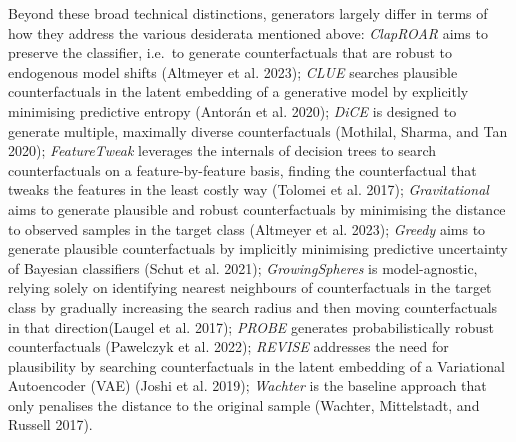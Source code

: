 \documentclass{juliacon}
\begin{document}
Beyond these broad technical distinctions, generators largely differ in
terms of how they address the various desiderata mentioned above:
\emph{ClapROAR} aims to preserve the classifier, i.e.~to generate
counterfactuals that are robust to endogenous model shifts (Altmeyer et
al. 2023); \emph{CLUE} searches plausible counterfactuals in the latent
embedding of a generative model by explicitly minimising predictive
entropy (Antorán et al. 2020); \emph{DiCE} is designed to generate
multiple, maximally diverse counterfactuals (Mothilal, Sharma, and Tan
2020); \emph{FeatureTweak} leverages the internals of decision trees to
search counterfactuals on a feature-by-feature basis, finding the
counterfactual that tweaks the features in the least costly way (Tolomei
et al. 2017); \emph{Gravitational} aims to generate plausible and robust
counterfactuals by minimising the distance to observed samples in the
target class (Altmeyer et al. 2023); \emph{Greedy} aims to generate
plausible counterfactuals by implicitly minimising predictive
uncertainty of Bayesian classifiers (Schut et al. 2021);
\emph{GrowingSpheres} is model-agnostic, relying solely on identifying
nearest neighbours of counterfactuals in the target class by gradually
increasing the search radius and then moving counterfactuals in that
direction(Laugel et al. 2017); \emph{PROBE} generates probabilistically
robust counterfactuals (Pawelczyk et al. 2022); \emph{REVISE} addresses
the need for plausibility by searching counterfactuals in the latent
embedding of a Variational Autoencoder (VAE) (Joshi et al. 2019);
\emph{Wachter} is the baseline approach that only penalises the distance
to the original sample (Wachter, Mittelstadt, and Russell 2017).
\end{document}
